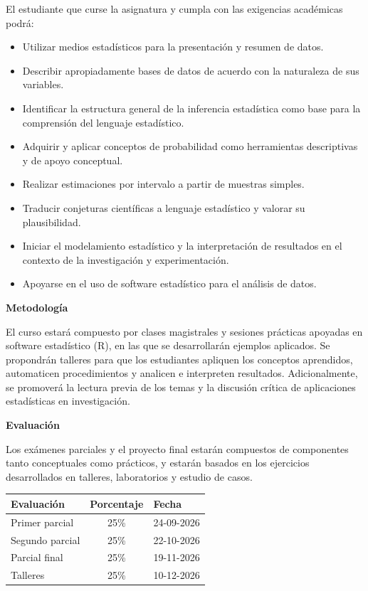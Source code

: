 \documentclass[12pt]{article}
\begin{document}
El estudiante que curse la asignatura y cumpla con las exigencias académicas podrá:
\begin{itemize}
    \item Utilizar medios estadísticos para la presentación y resumen de datos.
    \item Describir apropiadamente bases de datos de acuerdo con la naturaleza de sus variables.
    \item Identificar la estructura general de la inferencia estadística como base para la comprensión del lenguaje estadístico.
    \item Adquirir y aplicar conceptos de probabilidad como herramientas descriptivas y de apoyo conceptual.
    \item Realizar estimaciones por intervalo a partir de muestras simples.
    \item Traducir conjeturas científicas a lenguaje estadístico y valorar su plausibilidad.
    \item Iniciar el modelamiento estadístico y la interpretación de resultados en el contexto de la investigación y experimentación.
    \item Apoyarse en el uso de software estadístico para el análisis de datos.
\end{itemize}

\vspace{1em}

\textbf{\large Metodología}

El curso estará compuesto por clases magistrales y sesiones prácticas apoyadas en software estadístico (R), en las que se desarrollarán ejemplos aplicados. Se propondrán talleres para que los estudiantes apliquen los conceptos aprendidos, automaticen procedimientos y analicen e interpreten resultados. Adicionalmente, se promoverá la lectura previa de los temas y la discusión crítica de aplicaciones estadísticas en investigación.

\vspace{1em}

\textbf{\large Evaluación}

Los exámenes parciales y el proyecto final estarán compuestos de componentes tanto conceptuales como prácticos, y estarán basados en los ejercicios desarrollados en talleres, laboratorios y estudio de casos.

\begin{table}[h]
\centering
\begin{tabular}{l c l}
\hline
\textbf{Evaluación} & \textbf{Porcentaje} & \textbf{Fecha} \\
\hline
Primer parcial & 25\% & 24-09-2026 \\
Segundo parcial & 25\% & 22-10-2026 \\
Parcial final & 25\% & 19-11-2026 \\
Talleres & 25\% & 10-12-2026 \\
\hline
\end{tabular}
\end{table}
\end{document}
